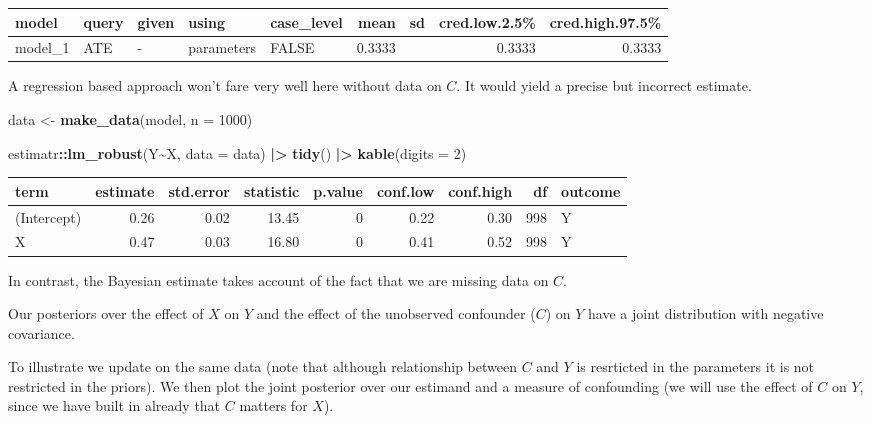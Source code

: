 \documentclass[
  12pt,
]{book}
\newenvironment{Shaded}{\begin{snugshade}}{\end{snugshade}}
\newcommand{\AttributeTok}[1]{\textcolor[rgb]{0.13,0.29,0.53}{#1}}
\newcommand{\DecValTok}[1]{\textcolor[rgb]{0.00,0.00,0.81}{#1}}
\newcommand{\FunctionTok}[1]{\textcolor[rgb]{0.13,0.29,0.53}{\textbf{#1}}}
\newcommand{\NormalTok}[1]{#1}
\newcommand{\OtherTok}[1]{\textcolor[rgb]{0.56,0.35,0.01}{#1}}
\newcommand{\SpecialCharTok}[1]{\textcolor[rgb]{0.81,0.36,0.00}{\textbf{#1}}}
\begin{document}
\begin{tabular}{l|l|l|l|l|r|r|r|r}
\hline
model & query & given & using & case\_level & mean & sd & cred.low.2.5\% & cred.high.97.5\%\\
\hline
model\_1 & ATE & - & parameters & FALSE & 0.3333 &  & 0.3333 & 0.3333\\
\hline
\end{tabular}

A regression based approach won't fare very well here without data on \(C\). It would yield a precise but incorrect estimate.

\begin{Shaded}
\begin{Highlighting}[]
\NormalTok{data }\OtherTok{\textless{}{-}} \FunctionTok{make\_data}\NormalTok{(model, }\AttributeTok{n =} \DecValTok{1000}\NormalTok{)}

\NormalTok{estimatr}\SpecialCharTok{::}\FunctionTok{lm\_robust}\NormalTok{(Y}\SpecialCharTok{\textasciitilde{}}\NormalTok{X, }\AttributeTok{data =}\NormalTok{ data) }\SpecialCharTok{|\textgreater{}}
  \FunctionTok{tidy}\NormalTok{() }\SpecialCharTok{|\textgreater{}} 
  \FunctionTok{kable}\NormalTok{(}\AttributeTok{digits =} \DecValTok{2}\NormalTok{)}
\end{Highlighting}
\end{Shaded}

\begin{tabular}{l|r|r|r|r|r|r|r|l}
\hline
term & estimate & std.error & statistic & p.value & conf.low & conf.high & df & outcome\\
\hline
(Intercept) & 0.26 & 0.02 & 13.45 & 0 & 0.22 & 0.30 & 998 & Y\\
\hline
X & 0.47 & 0.03 & 16.80 & 0 & 0.41 & 0.52 & 998 & Y\\
\hline
\end{tabular}

In contrast, the Bayesian estimate takes account of the fact that we are missing data on \(C\).

Our posteriors over the effect of \(X\) on \(Y\) and the effect of the unobserved confounder (\(C\)) on \(Y\) have a joint distribution with negative covariance.

To illustrate we update on the same data (note that although relationship between \(C\) and \(Y\) is resrticted in the parameters it is not restricted in the priors). We then plot the joint posterior over our estimand and a measure of confounding (we will use the effect of \(C\) on \(Y\), since we have built in already that \(C\) matters for \(X\)).
\end{document}
